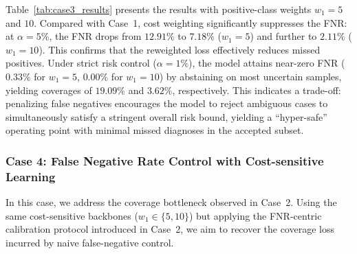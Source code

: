 \documentclass[sigconf,review,anonymous]{acmart}
\theoremstyle{remark}
\begin{document}
Table~\ref{tab:case3_results} presents the results with positive-class weights $w_1 = 5$ and $10$. Compared with Case~1, cost weighting significantly suppresses the FNR: at $\alpha=5\%$, the FNR drops from $12.91\%$ to $7.18\%$ ($w_1=5$) and further to $2.11\%$ ($w_1=10$). This confirms that the reweighted loss effectively reduces missed positives. Under strict risk control ($\alpha=1\%$), the model attains near-zero FNR ($0.33\%$ for $w_1=5$, $0.00\%$ for $w_1=10$) by abstaining on most uncertain samples, yielding coverages of $19.09\%$ and $3.62\%$, respectively. This indicates a trade-off: penalizing false negatives encourages the model to reject ambiguous cases to simultaneously satisfy a stringent overall risk bound, yielding a “hyper-safe” operating point with minimal missed diagnoses in the accepted subset.



\subsubsection{\textbf{Case 4: False Negative Rate Control with Cost-sensitive Learning}}
\label{sec:case4_results}

In this case, we address the coverage bottleneck observed in Case~2. Using the same cost-sensitive backbones ($w_{1} \in \{5, 10\}$) but applying the FNR-centric calibration protocol introduced in Case~2, we aim to recover the coverage loss incurred by naive false-negative control.

\begin{table}[htbp]
    \vskip -0.1in
    \centering
    \caption{The selective classification performance of Case 4 ($w_{1}=5$ and $w_{1}=10$).}
    \label{tab:case4_results}
    \vskip -0.1in
    \vskip -0.1in
\end{table}
\end{document}
